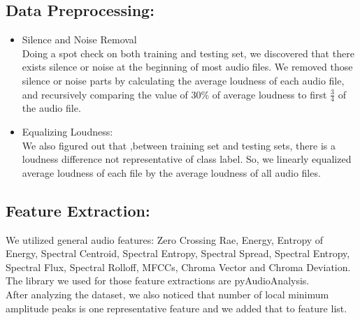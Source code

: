 \documentclass[conference]{IEEEtran}
\begin{document}
\subsection{Data Preprocessing:}
\begin{itemize}
	\item Silence and Noise Removal\\
	Doing a spot check on both training and testing set, we discovered that there exists silence or noise at the beginning of most audio files. We removed those silence or noise parts by calculating the average loudness of each audio file, and recursively comparing the value of 30\% of average loudness to first $\frac{3}{4}$ of the audio file.\\
	\item Equalizing Loudness:\\
	We also figured out that ,between training set and testing sets, there is a loudness difference not representative of class label. So, we linearly equalized average loudness of each file by the average loudness of all audio files. \\
\end{itemize}
\subsection{Feature Extraction:}
	We utilized general audio features: Zero Crossing Rae, Energy, Entropy of Energy, Spectral Centroid, Spectral Entropy, Spectral Spread, Spectral Entropy, Spectral Flux, Spectral Rolloff,  MFCCs, Chroma Vector and Chroma Deviation. The library we used for those feature extractions are pyAudioAnalysis\cite{b1}.\\
	After analyzing the dataset, we also noticed that number of local minimum amplitude peaks is one representative feature and we added that to feature list.\\
\end{document}
